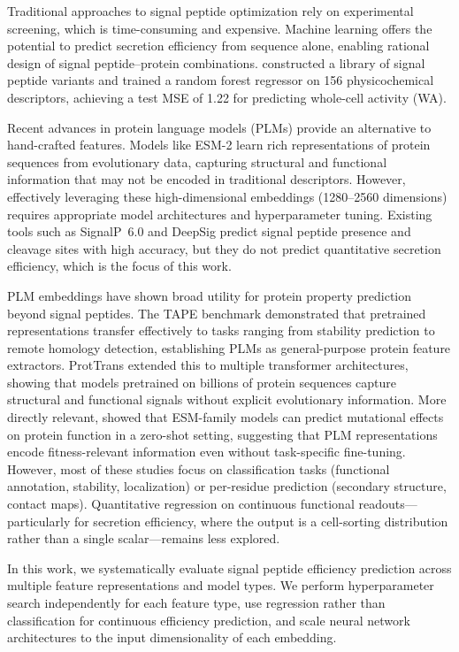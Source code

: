 \documentclass[12pt]{article}
\begin{document}
Traditional approaches to signal peptide optimization rely on experimental screening, which is time-consuming and expensive.
Machine learning offers the potential to predict secretion efficiency from sequence alone, enabling rational design of signal peptide--protein combinations.
\citet{grasso2023} constructed a library of signal peptide variants and trained a random forest regressor on 156 physicochemical descriptors, achieving a test MSE of 1.22 for predicting whole-cell activity (WA).

Recent advances in protein language models (PLMs) provide an alternative to hand-crafted features.
Models like ESM-2 \citep{lin2023} learn rich representations of protein sequences from evolutionary data, capturing structural and functional information that may not be encoded in traditional descriptors.
However, effectively leveraging these high-dimensional embeddings (1280--2560 dimensions) requires appropriate model architectures and hyperparameter tuning.
Existing tools such as SignalP~6.0 \citep{teufel2022} and DeepSig \citep{savojardo2018} predict signal peptide presence and cleavage sites with high accuracy, but they do not predict quantitative secretion efficiency, which is the focus of this work.

PLM embeddings have shown broad utility for protein property prediction beyond signal peptides.
The TAPE benchmark \citep{rao2019} demonstrated that pretrained representations transfer effectively to tasks ranging from stability prediction to remote homology detection, establishing PLMs as general-purpose protein feature extractors.
ProtTrans \citep{elnaggar2022} extended this to multiple transformer architectures, showing that models pretrained on billions of protein sequences capture structural and functional signals without explicit evolutionary information.
More directly relevant, \citet{meier2021} showed that ESM-family models can predict mutational effects on protein function in a zero-shot setting, suggesting that PLM representations encode fitness-relevant information even without task-specific fine-tuning.
However, most of these studies focus on classification tasks (functional annotation, stability, localization) or per-residue prediction (secondary structure, contact maps).
Quantitative regression on continuous functional readouts---particularly for secretion efficiency, where the output is a cell-sorting distribution rather than a single scalar---remains less explored.

In this work, we systematically evaluate signal peptide efficiency prediction across multiple feature representations and model types.
We perform hyperparameter search independently for each feature type, use regression rather than classification for continuous efficiency prediction, and scale neural network architectures to the input dimensionality of each embedding.
\end{document}
